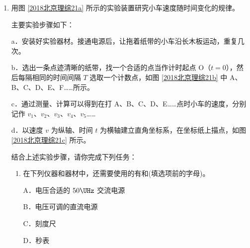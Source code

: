 \documentclass[\gkver]{gaokaozhenti}
\begin{document}
\begin{enumerate}

\item
用图 \ref{2018北京理综21a} 所示的实验装置研究小车速度随时间变化的规律。

主要实验步骤如下：

a．安装好实验器材。接通电源后，让拖着纸带的小车沿长木板运动，重复几次。

b．选出一条点迹清晰的纸带，找一个合适的点当作计时起点 O（$t = 0$），然后每隔相同的时间间隔 $T$ 选取一个计数点，如图 \ref{2018北京理综21b} 中 A、B、C、D、E、F……所示。

c．通过测量、计算可以得到在打 A、B、C、D、E……点时小车的速度，分别记作 $v_{1}$、$v_{2}$、$v_{3}$、$v_{4}$、$v_{5}$……

d．以速度 $v$ 为纵轴、时间 $t$ 为横轴建立直角坐标系，在坐标纸上描点，如图 \ref{2018北京理综21c} 所示。

结合上述实验步骤，请你完成下列任务：
\begin{enumerate}
	\item
	在下列仪器和器材中，还需要使用的有和(填选项前的字母)。

	A．电压合适的 $50\UHz$ 交流电源

	B．电压可调的直流电源

	C．刻度尺

	D．秒表


\end{enumerate}
\end{enumerate}
\end{document}

